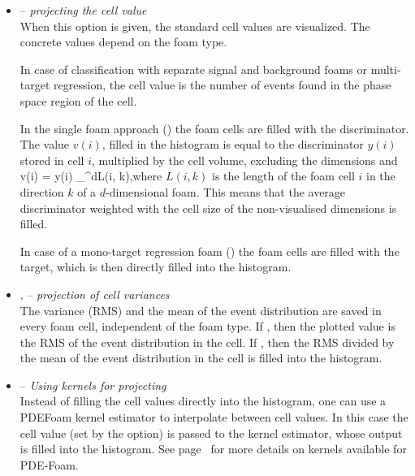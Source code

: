 \begin{itemize}
\item {} -- {\em projecting the cell value}\\
  When this option is given, the standard cell values are visualized.
  The concrete values depend on the foam type.

  In case of classification with separate signal and background foams
  or multi-target regression, the cell value is the number of events
  found in the phase space region of the cell.

  In the single foam approach () the foam
  cells are filled with the discriminator.  The value $v(i)$, filled
  in the histogram is equal to the discriminator $y(i)$ stored in cell
  $i$, multiplied by the cell volume, excluding the dimensions
   and  \beq v(i) = y(i)\!\!\!
  \prod_{}^{d}\!\!\!\!L(i,
  k)\;,\eeq where $L(i, k)$ is the length of the foam cell $i$ in the
  direction $k$ of a $d$-dimensional foam. This means that the average
  discriminator weighted with the cell size of the non-visualised
  dimensions is filled.

  In case of a mono-target regression foam
  () the foam cells are filled
  with the target, which is then directly filled into the histogram.

\item {},  -- {\em projection of cell variances}\\
  The variance (RMS) and the mean of the event distribution are saved
  in every foam cell, independent of the foam type.  If
  , then the plotted value is the RMS of the
  event distribution in the cell.  If ,
  then the RMS divided by the mean of the event distribution in the
  cell is filled into the histogram.

\item {} -- {\em Using kernels for projecting}\\
  Instead of filling the cell values directly into the histogram, one
  can use a PDEFoam kernel estimator to interpolate between cell
  values.  In this case the cell value (set by the 
  option) is passed to the kernel estimator, whose output is filled
  into the histogram.  See page~\pageref{sec:PDEFoam-kernel} for more
  details on kernels available for PDE-Foam.
\end{itemize}

